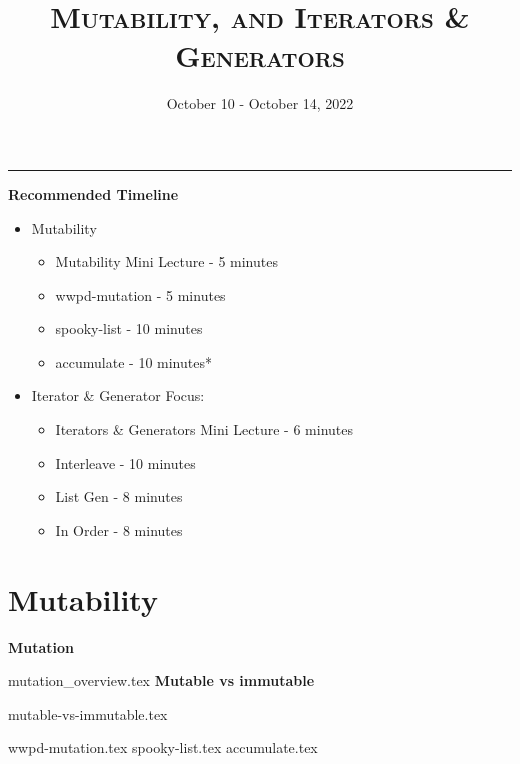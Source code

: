 \documentclass{exam}
\title{\textsc{Mutability, and Iterators \& Generators}}
\date{October 10 - October 14, 2022}
\begin{document}
\maketitle
\rule{\textwidth}{0.15em}
\fontsize{12}{15}\selectfont


\begin{guide}
    \newline
    \textbf{Recommended Timeline}
    \begin{itemize}
        \item Mutability
        \begin{itemize}
            \item Mutability Mini Lecture - 5 minutes
            \item wwpd-mutation - 5 minutes
            \item spooky-list - 10 minutes
            \item accumulate - 10 minutes*
        \end{itemize}
        \item Iterator \& Generator Focus:
        \begin{itemize}
            \item Iterators \& Generators Mini Lecture - 6 minutes
            \item Interleave - 10 minutes
            \item List Gen - 8 minutes
            \item In Order - 8 minutes
        \end{itemize}
    \end{itemize}
\end{guide}

\section{Mutability}
	\textbf{Mutation}

	{mutation_overview.tex}
	\textbf{Mutable vs immutable}

	{mutable-vs-immutable.tex}
	\begin{questions}
		{wwpd-mutation.tex}
		\newpage
		{spooky-list.tex}
		\newpage
		{accumulate.tex}
	\end{questions}
\end{document}
